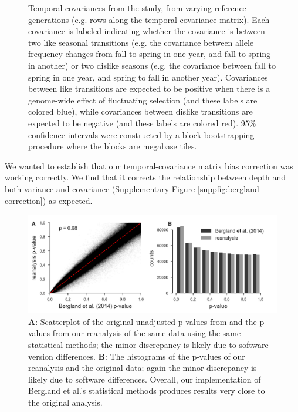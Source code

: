 \documentclass[11pt]{article}
\begin{document}
{\begin{figure}[!ht]
  \caption{Temporal covariances from the \textcite{Bergland2014-ij} study, from
    varying reference generations (e.g. rows along the temporal covariance
    matrix). Each covariance is labeled indicating whether the covariance is
    between two like seasonal transitions (e.g. the covariance between allele
    frequency changes from fall to spring in one year, and fall to spring in
    another) or two dislike seasons (e.g. the covariance between fall to spring
    in one year, and spring to fall in another year). Covariances between like
    transitions are expected to be positive when there is a genome-wide effect
    of fluctuating selection (and these labels are colored blue), while
    covariances between dislike transitions are expected to be negative (and
    these labels are colored red). 95\% confidence intervals were constructed
    by a block-bootstrapping procedure where the blocks are megabase tiles.}

  \label{suppfig:bergland-covs-figure}
\end{figure}

We wanted to establish that our temporal-covariance matrix bias correction was
working correctly. We find that it corrects the relationship between depth and
both variance and covariance (Supplementary Figure
\ref{suppfig:bergland-correction}) as expected.

\begin{figure}[!ht]
  \centering
  \includegraphics[width=\textwidth]{figures/bergland_pvalues.pdf}

  \caption{\textbf{A}: Scatterplot of the original unadjusted p-values from
    \textcite{Bergland2014-ij} and the p-values from our reanalysis of the same
    data using the same statistical methods; the minor discrepancy is likely
    due to software version differences. \textbf{B}: The histograms of the
    p-values of our reanalysis and the original \textcite{Bergland2014-ij}
    data; again the minor discrepancy is likely due to software differences.
    Overall, our implementation of Bergland et al.'s statistical methods
    produces results very close to the original analysis.}


\end{figure}}
\end{document}
